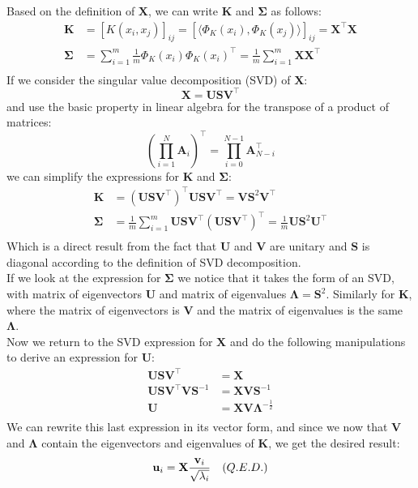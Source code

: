 \documentclass{article}
\begin{document}
\begin{enumerate}
Based on the definition of $\mathbf{X}$, we can write $\mathbf{K}$ and $\mathbf{\Sigma}$ as follows:
\begin{align*}
    \mathbf{K} &= \left[K(x_{i},x_{j})\right]_{ij} = \left[\langle \Phi_{K}(x_i), \Phi_{K}(x_j) \rangle\right]_{ij} = \mathbf{X}^{\top}\mathbf{X}\\
    \mathbf{\Sigma} &= \sum_{i=1}^{m}\frac{1}{m}\Phi_{K}(x_{i})\Phi_{K}(x_{i})^{\top} = \frac{1}{m} \sum_{i=1}^{m}\mathbf{X}\mathbf{X}^{\top}\\
\end{align*}
If we consider the singular value decomposition (SVD) of $\mathbf{X}$:
\begin{equation*}
    \mathbf{X} = \mathbf{U}\mathbf{S}\mathbf{V}^{\top}
\end{equation*}
and use the basic property in linear algebra for the transpose of a product of matrices:
\begin{equation*}
    \left(\prod_{i=1}^{N}\mathbf{A}_i\right)^{\top} = \prod_{i=0}^{N-1}\mathbf{A}_{N-i}^{\top}
\end{equation*}
we can simplify the expressions for $\mathbf{K}$ and $\mathbf{\Sigma}$:
\begin{align*}
    \mathbf{K} &= (\mathbf{U}\mathbf{S}\mathbf{V}^{\top})^{\top}\mathbf{U}\mathbf{S}\mathbf{V}^{\top} = \mathbf{V}\mathbf{S}^{2}\mathbf{V}^{\top}\\
    \mathbf{\Sigma} &= \frac{1}{m} \sum_{i=1}^{m}\mathbf{U}\mathbf{S}\mathbf{V}^{\top}(\mathbf{U}\mathbf{S}\mathbf{V}^{\top})^{\top}
    = \frac{1}{m}\mathbf{U}\mathbf{S}^{2}\mathbf{U}^{\top}\\
\end{align*}
Which is a direct result from the fact that $\mathbf{U}$ and $\mathbf{V}$ are unitary and $\mathbf{S}$ is diagonal according to the definition of SVD decomposition.\\
If we look at the expression for $\mathbf{\Sigma}$ we notice that it takes the form of an SVD, with matrix of eigenvectors $\mathbf{U}$ and matrix of eigenvalues $\mathbf{\Lambda}=\mathbf{S}^2$. Similarly for $\mathbf{K}$, where the matrix of eigenvectors is $\mathbf{V}$ and the matrix of eigenvalues is the same $\mathbf{\Lambda}$.\\
Now we return to the SVD expression for $\mathbf{X}$ and do the following manipulations to derive an expression for $\mathbf{U}$:
\begin{align*}
    \mathbf{U}\mathbf{S}\mathbf{V}^{\top} &= \mathbf{X}\\
    \mathbf{U}\mathbf{S}\mathbf{V}^{\top}\mathbf{V}\mathbf{S}^{-1} &= \mathbf{X}\mathbf{V}\mathbf{S}^{-1}\\
    \mathbf{U} &= \mathbf{X}\mathbf{V}\mathbf{\Lambda}^{-\frac{1}{2}}\\
\end{align*}
We can rewrite this last expression in its vector form, and since we now that $\mathbf{V}$ and $\mathbf{\Lambda}$ contain the eigenvectors and eigenvalues of $\mathbf{K}$, we get the desired result:
\begin{equation*}
    \mathbf{u}_i = \mathbf{X}\frac{\mathbf{v}_i}{\sqrt{\lambda_i}} \textit \quad {(Q.E.D.)}
\end{equation*}


\end{enumerate}
\end{document}
